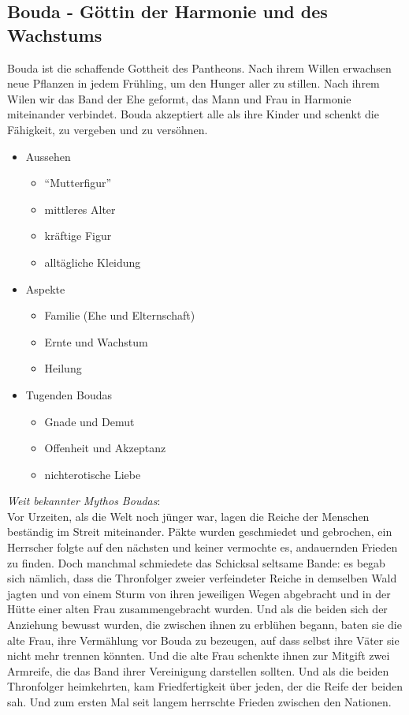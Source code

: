 \subsection{\textbf{Bouda} - Göttin der Harmonie und des Wachstums}
Bouda ist die schaffende Gottheit des Pantheons. Nach ihrem Willen erwachsen neue Pflanzen in jedem Frühling, um den Hunger aller zu stillen. Nach ihrem Wilen wir das Band 
der Ehe geformt, das Mann und Frau in Harmonie miteinander verbindet. Bouda akzeptiert alle als ihre Kinder und schenkt die Fähigkeit, zu vergeben und zu versöhnen.\\
\begin{itemize}
	\item Aussehen 
	\begin{itemize}
		\item ``Mutterfigur''
		\item mittleres Alter 
		\item kräftige Figur
		\item alltägliche Kleidung 
	\end{itemize}
	\item Aspekte
	\begin{itemize}
		\item Familie (Ehe und Elternschaft)
		\item Ernte und Wachstum
		\item Heilung
	\end{itemize}
	\item Tugenden Boudas
	\begin{itemize}
		\item Gnade und Demut
		\item Offenheit und Akzeptanz
		\item nichterotische Liebe
	\end{itemize}
\end{itemize}
\textit{Weit bekannter Mythos Boudas}:\\
Vor Urzeiten, als die Welt noch jünger war, lagen die Reiche der Menschen beständig im Streit miteinander. Päkte wurden geschmiedet und gebrochen, ein Herrscher folgte auf den 
nächsten und keiner vermochte es, andauernden Frieden zu finden. Doch manchmal schmiedete das Schicksal seltsame Bande: es begab sich nämlich, dass die Thronfolger zweier 
verfeindeter Reiche in demselben Wald jagten und von einem Sturm von ihren jeweiligen Wegen abgebracht und in der 
Hütte einer alten Frau zusammengebracht wurden. Und als die beiden sich der Anziehung bewusst wurden, die zwischen ihnen zu erblühen begann, baten sie die alte Frau, ihre
Vermählung vor Bouda zu bezeugen, auf dass selbst ihre Väter sie nicht mehr trennen könnten. Und die alte Frau schenkte ihnen zur Mitgift zwei Armreife, die das Band ihrer Vereinigung 
darstellen sollten. Und als die beiden Thronfolger heimkehrten, kam Friedfertigkeit über jeden, der die Reife der beiden sah. Und zum ersten Mal seit langem herrschte Frieden 
zwischen den Nationen.

